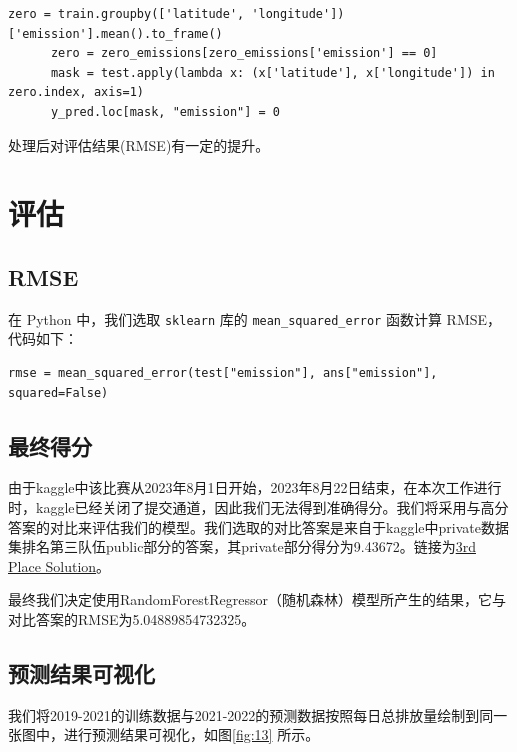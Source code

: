\documentclass{ctexart}
\begin{document}
\begin{sloppypar}
\begin{lstlisting}[style=Python]
      zero = train.groupby(['latitude', 'longitude'])['emission'].mean().to_frame()
      zero = zero_emissions[zero_emissions['emission'] == 0]
      mask = test.apply(lambda x: (x['latitude'], x['longitude']) in zero.index, axis=1)
      y_pred.loc[mask, "emission"] = 0
\end{lstlisting}

处理后对评估结果(RMSE)有一定的提升。

\section{评估}

\subsection{RMSE}

在 Python 中，我们选取 \texttt{sklearn} 库的 \texttt{mean\_squared\_error} 函数计算 RMSE，代码如下：

\begin{lstlisting}[style=Python]
      rmse = mean_squared_error(test["emission"], ans["emission"], squared=False)
\end{lstlisting}

\subsection{最终得分}

由于kaggle中该比赛从2023年8月1日开始，2023年8月22日结束，在本次工作进行时，kaggle已经关闭了提交通道，因此我们无法得到准确得分。我们将采用与高分答案的对比来评估我们的模型。我们选取的对比答案是来自于kaggle中private数据集排名第三队伍public部分的答案，其private部分得分为9.43672。链接为\href{https://www.kaggle.com/competitions/playground-series-s3e20/discussion/433822}{3rd Place Solution}。

最终我们决定使用RandomForestRegressor（随机森林）模型所产生的结果，它与对比答案的RMSE为5.04889854732325。

\subsection{预测结果可视化}

我们将2019-2021的训练数据与2021-2022的预测数据按照每日总排放量绘制到同一张图中，进行预测结果可视化，如图\ref{fig:13} 所示。


\end{sloppypar}
\end{document}
